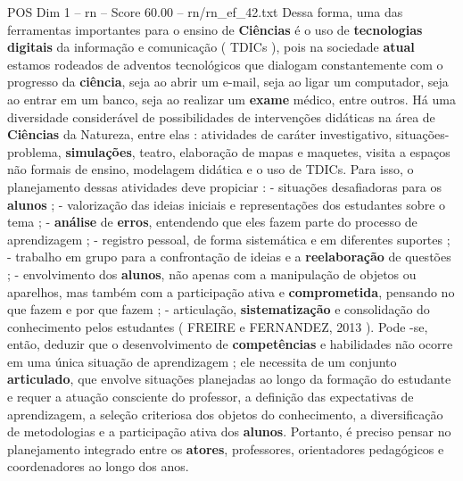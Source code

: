 \begin{textsample}{POS Dim 1 – rn – Score 60.00 – rn/rn\_ef\_42.txt}
Dessa forma, uma das ferramentas importantes para o ensino de \textbf{Ciências} é o uso de \textbf{tecnologias} \textbf{digitais} da informação e comunicação ( TDICs ), pois na sociedade \textbf{atual} estamos rodeados de adventos tecnológicos que dialogam constantemente com o progresso da \textbf{ciência}, seja ao abrir um e-mail, seja ao ligar um computador, seja ao entrar em um banco, seja ao realizar um \textbf{exame} médico, entre outros.
Há uma diversidade considerável de possibilidades de intervenções didáticas na área de \textbf{Ciências} da Natureza, entre elas : atividades de caráter investigativo, situações-problema, \textbf{simulações}, teatro, elaboração de mapas e maquetes, visita a espaços não formais de ensino, modelagem didática e o uso de TDICs.
Para isso, o planejamento dessas atividades deve propiciar : - situações desafiadoras para os \textbf{alunos} ; - valorização das ideias iniciais e representações dos estudantes sobre o tema ; - \textbf{análise} de \textbf{erros}, entendendo que eles fazem parte do processo de aprendizagem ; - registro pessoal, de forma sistemática e em diferentes suportes ; - trabalho em grupo para a confrontação de ideias e a \textbf{reelaboração} de questões ; - envolvimento dos \textbf{alunos}, não apenas com a manipulação de objetos ou aparelhos, mas também com a participação ativa e \textbf{comprometida}, pensando no que fazem e por que fazem ; - articulação, \textbf{sistematização} e consolidação do conhecimento pelos estudantes ( FREIRE e FERNANDEZ, 2013 ).
Pode -se, então, deduzir que o desenvolvimento de \textbf{competências} e habilidades não ocorre em uma única situação de aprendizagem ; ele necessita de um conjunto \textbf{articulado}, que envolve situações planejadas ao longo da formação do estudante e requer a atuação consciente do professor, a definição das expectativas de aprendizagem, a seleção criteriosa dos objetos do conhecimento, a diversificação de metodologias e a participação ativa dos \textbf{alunos}.
Portanto, é preciso pensar no planejamento integrado entre os \textbf{atores}, professores, orientadores pedagógicos e coordenadores ao longo dos anos.

\end{textsample}

